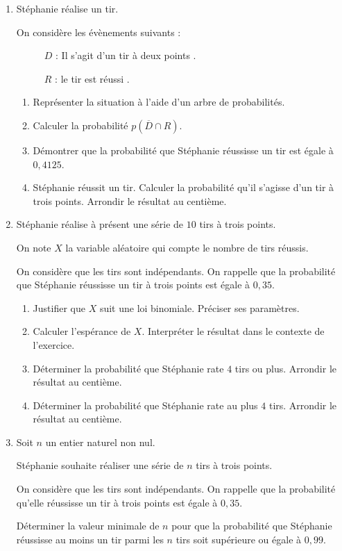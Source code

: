 \documentclass[11pt]{article}
\begin{document}
\begin{enumerate}
\item Stéphanie réalise un tir. 

On considère les évènements suivants :

\begin{description}
\item[ ] $D$ : \og Il s'agit d'un tir à deux points \fg.
\item[ ] $R$ : \og le tir est réussi \fg.
\end{description}
	\begin{enumerate}
		\item Représenter la situation à l'aide d'un arbre de probabilités.
		\item Calculer la probabilité $p\left(\overline{D} \cap R\right)$.
		\item Démontrer que la probabilité que Stéphanie réussisse un tir est égale à $0,4125$.
		\item Stéphanie réussit un tir. Calculer la probabilité qu'il s'agisse d'un tir à trois points. Arrondir le résultat au centième.
	\end{enumerate}	
\item Stéphanie réalise à présent une série de $10$ tirs à trois points.

On note $X$ la variable aléatoire qui compte le nombre de tirs réussis.

On considère que les tirs sont indépendants. On rappelle que la probabilité que Stéphanie réussisse un tir à trois points est égale à $0,35$.
	\begin{enumerate}
		\item Justifier que $X$ suit une loi binomiale. Préciser ses paramètres.
		\item Calculer l'espérance de $X$. Interpréter le résultat dans le contexte de l'exercice.
		\item Déterminer la probabilité que Stéphanie rate $4$ tirs ou plus. Arrondir le résultat au centième.
		\item Déterminer la probabilité que Stéphanie rate au plus $4$ tirs. Arrondir le résultat au centième.
	\end{enumerate}
\item Soit $n$ un entier naturel non nul.

Stéphanie souhaite réaliser une série de $n$ tirs à trois points. 

On considère que les tirs sont indépendants. On rappelle que la probabilité qu'elle réussisse un tir à trois points est égale à $0,35$.

Déterminer la valeur minimale de $n$ pour que la probabilité que Stéphanie réussisse au moins un tir parmi les $n$ tirs soit supérieure ou égale à $0,99$.
\end{enumerate}
\end{document}
